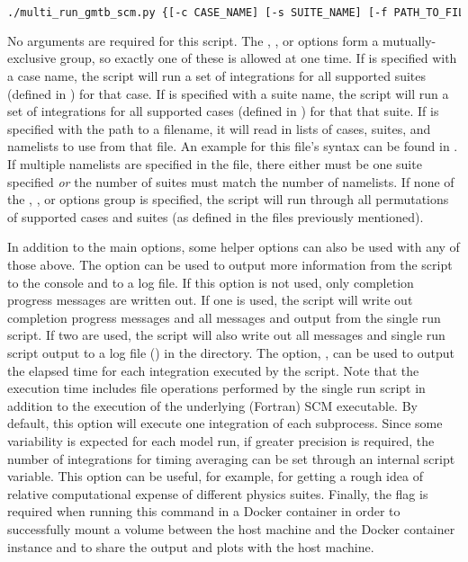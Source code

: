 \begin{lstlisting}[language=bash]
./multi_run_gmtb_scm.py {[-c CASE_NAME] [-s SUITE_NAME] [-f PATH_TO_FILE]} [-v{v}] [-t] [-d]
\end{lstlisting}

No arguments are required for this script. The , , or  options form a mutually-exclusive group, so exactly one of these is allowed at one time. If  is specified with a case name, the script will run a set of integrations for all supported suites (defined in ) for that case. If  is specified with a suite name, the script will run a set of integrations for all supported cases (defined in ) for that that suite. If  is specified with the path to a filename, it will read in lists of cases, suites, and namelists to use from that file. An example for this file's syntax can be found in . If multiple namelists are specified in the file, there either must be one suite specified \emph{or} the number of suites must match the number of namelists. If none of the , , or  options group is specified, the script will run through all permutations of supported cases and suites (as defined in the files previously mentioned).

In addition to the main options, some helper options can also be used with any of those above. The  option can be used to output more information from the script to the console and to a log file. If this option is not used, only completion progress messages are written out. If one  is used, the script will write out completion progress messages and all messages and output from the single run script. If two  are used, the script will also write out all messages and single run script output to a log file () in the  directory. The option, , can be used to output the elapsed time for each integration executed by the script. Note that the execution time includes file operations performed by the single run script in addition to the execution of the underlying (Fortran) SCM executable. By default, this option will execute one integration of each subprocess. Since some variability is expected for each model run, if greater precision is required, the number of integrations for timing averaging can be set through an internal script variable. This option can be useful, for example, for getting a rough idea of relative computational expense of different physics suites. Finally, the  flag is required when running this command in a Docker container in order to successfully mount a volume between the host machine and the Docker container instance and to share the output and plots with the host machine.

